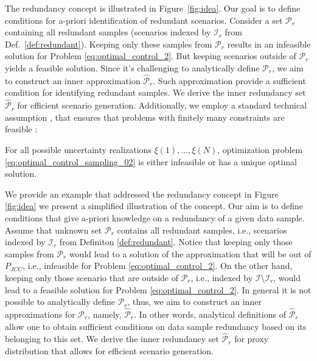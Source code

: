 The redundancy concept is illustrated in Figure~\ref{fig:idea}. Our goal is to define conditions for a-priori identification of redundant scenarios. Consider a set $\mathcal{P}_r$ containing all redundant samples (scenarios indexed by $\mathcal{I}_{r}$ from Def.~\ref{def:redundant}). Keeping only these samples from $\mathcal{P}_r$ results in an infeasible solution for Problem \eqref{eq:optimal_control_2}. But keeping scenarios outside of $\mathcal{P}_r$ yields a feasible solution. Since it's challenging to analytically define $\mathcal{P}_r$, we aim to construct an inner approximation $\hat{\mathcal{P}}_r$. Such approximation provide a sufficient condition for identifying redundant samples. We derive the inner redundancy set $\hat{\mathcal{P}}_r$ for efficient scenario generation. Additionally, we employ a standard technical assumption \cite{campi2011sampling},  that ensures that problems with finitely many constraints are feasible%
:
\begin{assumption}\label{asmp:10}
For all possible uncertainty realizations $\xi(1), \dots, \xi(N)$, optimization problem \eqref{eq:optimal_control_sampling_02} is either infeasible or has a unique optimal solution.
\end{assumption}
We provide an example that addressed the redundancy concept in Figure \ref{fig:idea} we present a simplified illustration of the concept. Our aim is to define conditions that give a-priori knowledge on a redundancy of a given data sample. Assume that unknown set $\mathcal{P}_r$ contains all redundant samples, i.e., scenarios indexed by $\mathcal{I}_{r}$ from Definiton \ref{def:redundant}. Notice that keeping only those samples from $\mathcal{P}_r$ would lead to a solution of the approximation that will be out of $P_{JCC}$, i.e., infeasible for Problem \eqref{eq:optimal_control_2}. On the other hand, keeping only those scenario that are outside of $\mathcal{P}_r$, i.e., indexed by $\mathcal{I} \setminus \mathcal{I}_r$, would lead to a feasible solution for Problem \eqref{eq:optimal_control_2}. In general it is not possible to analytically define $\mathcal{P}_r$, thus, we aim to construct an inner approximations for $\mathcal{P}_r$, namely, $\hat{\mathcal{P}}_r$. In other words, analytical definitions of $\hat{\mathcal{P}}_r$ allow one to obtain sufficient conditions on data sample redundancy based on its belonging to this set. We derive the inner redundancy set $\hat{\mathcal{P}}_r$ for proxy distribution that allows for efficient scenario generation. 
